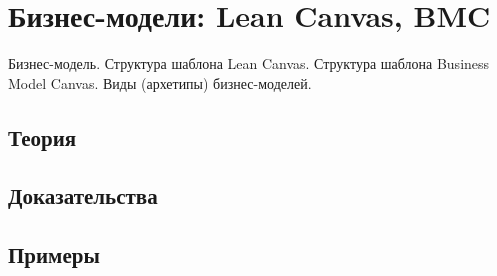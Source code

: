 
\section{Бизнес-модели: Lean Canvas, BMC}
\label{sec:2.6.12-business-models}

\begin{ticket}
Бизнес-модель. Структура шаблона Lean Canvas. Структура шаблона Business Model Canvas. Виды (архетипы) бизнес-моделей.
\end{ticket}

\subsection*{Теория}

\subsection*{Доказательства}

\subsection*{Примеры}

